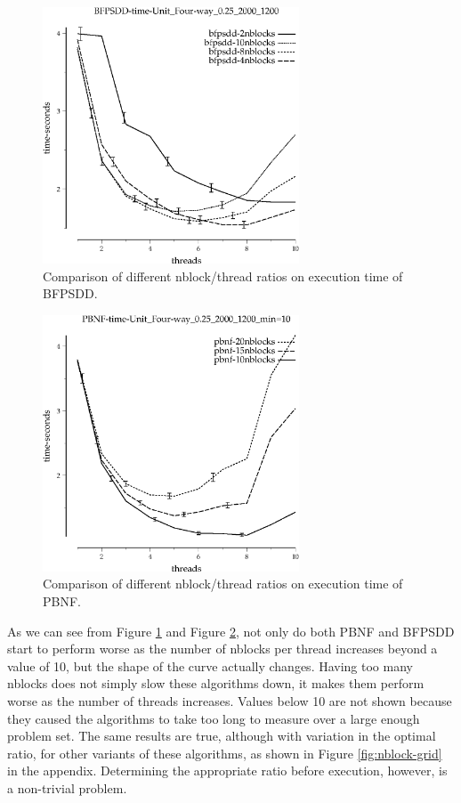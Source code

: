 \documentclass{article}
\begin{document}
\begin{figure}[h!]
\includegraphics[width=3in]{../graphs/grid_unit_four-way_0.25_2000_1200/BFPSDD-time-Unit_Four-way_0.25_2000_1200.eps}
\caption{Comparison of different nblock/thread ratios on execution time of BFPSDD.}
\label{fig:BFPSDD-nblock-grid}
\end{figure}

\begin{figure}[h!]
\includegraphics[width=3in]{../graphs/grid_unit_four-way_0.25_2000_1200/PBNF-time-Unit_Four-way_0.25_2000_1200_min=10.eps}
\caption{Comparison of different nblock/thread ratios on execution time of PBNF.}
\label{fig:PBNF-nblock-grid}
\end{figure}

As we can see from Figure \ref{fig:BFPSDD-nblock-grid} and Figure \ref{fig:PBNF-nblock-grid}, not only do both PBNF and BFPSDD start to perform worse as the number of nblocks per thread increases beyond a value of 10, but the shape of the curve actually changes. Having too many nblocks does not simply slow these algorithms down, it makes them perform worse as the number of threads increases. Values below 10 are not shown because they caused the algorithms to take too long to measure over a large enough problem set. The same results are true, although with variation in the optimal ratio, for other variants of these algorithms, as shown in Figure \ref{fig:nblock-grid} in the appendix. Determining the appropriate ratio before execution, however, is a non-trivial problem.
\end{document}

